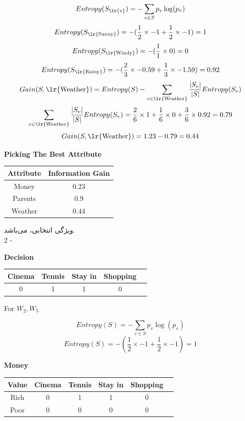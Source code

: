 \documentclass{article}
\newcommand{\tf}[1]{\text{\lr{#1}}}
\begin{document}
	\[
	Entropy(S_{\tf{v}}) = -\sum_{v \in S} p_v\log (p_v)
	\]
	\[
	Entropy(S_{\tf{Sunny}}) = -(\frac{1}{2} \times -1 + \frac{1}{2} \times -1) = 1
	\]
	\[
	Entropy(S_{\tf{Windy}}) = -(\frac{1}{1} \times 0) = 0
	\]
	\[
	Entropy(S_{\tf{Rainy}}) = -(\frac{2}{3} \times -0.59 + \frac{1}{3} \times -1.59) = 0.92
	\]
	\vspace{10pt}
	\[
	Gain(S, \tf{Weather}) = Entropy(S) - \sum_{v \in \tf{Weather}} \frac{| S_v |}{| S |}Entropy(S_v)
	\] 
	\[
	\sum_{v \in \tf{Weather}} \frac{| S_v |}{| S |}Entropy(S_v) = \frac{2}{6} \times 1 + \frac{1}{6} \times 0 + \frac{3}{6} \times 0.92 = 0.79
	\]
	\[
	Gain(S, \tf{Weather}) = 1.23 - 0.79 = 0.44
	\]
	\begin{latin}
		\textbf{Picking The Best Attribute}
		\begin{center}
			\begin{tabular}{|c|c|}
				\hline
				Attribute & Information Gain\\
				\hline
				\hline
				Money & 0.23\\
				Parents & 0.9\\
				Weather & 0.44\\
				\hline
			\end{tabular}
		\end{center}
	\end{latin}
	ویژگی انتخابی،
	می‌باشد.\\
	2 - 
	\begin{latin}
		\textbf{Decision}
		\begin{center}
			\begin{tabular}{|c|c|c|c|c|}
				\hline
				Cinema & Tennis & Stay in & Shopping\\
				\hline
				\hline
				0 & 1 & 1 & 0\\
				\hline
			\end{tabular}
		\end{center}
		For $W_2, W_5$
	\end{latin}
	\vspace{5pt}
	\[
	Entropy(S) = -\sum_{v \in S} p_v\log (p_v)
	\]
	\[
	Entropy(S) = -( \frac{1}{2} \times -1 + \frac{1}{2} \times -1) = 1
	\]
	\begin{latin}
		\textbf{Money}
		\begin{center}
			\begin{tabular}{|c|c|c|c|c|c|}
				\hline
				Value & Cinema & Tennis & Stay in & Shopping\\
				\hline
				\hline
				Rich & 0 & 1 & 1 & 0\\
				\hline
				Poor & 0 & 0 & 0 & 0\\
				\hline
			\end{tabular}
		\end{center}
	\end{latin}
\end{document}
